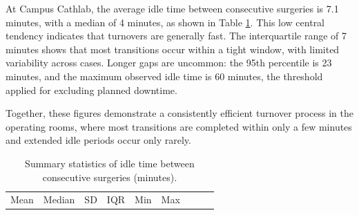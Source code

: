 \documentclass[
]{article}
\begin{document}
At Campus Cathlab, the average idle time between consecutive surgeries
is 7.1 minutes, with a median of 4 minutes, as shown in Table
\ref{tab:idle_summary}. This low central tendency indicates that
turnovers are generally fast. The interquartile range of 7 minutes shows
that most transitions occur within a tight window, with limited
variability across cases. Longer gaps are uncommon: the 95th percentile
is 23 minutes, and the maximum observed idle time is 60 minutes, the
threshold applied for excluding planned downtime.

Together, these figures demonstrate a consistently efficient turnover
process in the operating rooms, where most transitions are completed
within only a few minutes and extended idle periods occur only rarely.

\begin{longtable}[]{@{}
  >{\centering\arraybackslash}p{}
  >{\centering\arraybackslash}p{}
  >{\centering\arraybackslash}p{}
  >{\centering\arraybackslash}p{}
  >{\centering\arraybackslash}p{}
  >{\centering\arraybackslash}p{}
  >{\centering\arraybackslash}p{}
  >{\centering\arraybackslash}p{}
  >{\centering\arraybackslash}p{}@{}}
\caption{Summary statistics of idle time between consecutive surgeries
(minutes). \label{tab:idle_summary}}\tabularnewline
\toprule\noalign{}
\begin{minipage}[b]{\linewidth}\centering
Mean
\end{minipage} & \begin{minipage}[b]{\linewidth}\centering
Median
\end{minipage} & \begin{minipage}[b]{\linewidth}\centering
SD
\end{minipage} & \begin{minipage}[b]{\linewidth}\centering
IQR
\end{minipage} & \begin{minipage}[b]{\linewidth}\centering
Min
\end{minipage} & \begin{minipage}[b]{\linewidth}\centering
Max
\end{minipage} & \begin{minipage}[b]{\linewidth}\centering

\end{minipage}
\end{longtable}
\end{document}
